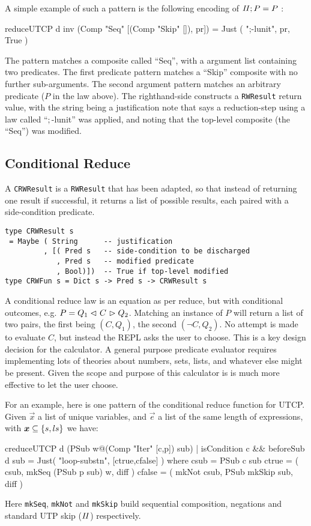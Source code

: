 A simple example of such a pattern is the following encoding
of $\mathit{II};P = P$ :
\begin{code}
reduceUTCP d inv (Comp "Seq" [(Comp "Skip" []), pr])
   =  Just ( ";-lunit", pr, True )
\end{code}
The pattern
matches a composite called ``Seq'',
with a argument list containing two predicates.
The first predicate pattern
matches a ``Skip'' composite with no further sub-arguments.
The second argument pattern matches an arbitrary predicate
($P$ in the law above).
The righthand-side constructs a \texttt{RWResult} return value,
with the string being a justification note that says a reduction-step
using a law called ``$;$-lunit'' was applied,
and noting that the top-level composite (the ``Seq'') was modified.


\subsection{Conditional Reduce}

A \texttt{CRWResult} is a \texttt{RWResult} that has been adapted,
so that instead of returning one result if successful,
it returns a list of possible results,
each paired with a side-condition predicate.
\begin{verbatim}
type CRWResult s
 = Maybe ( String      -- justification
         , [( Pred s   -- side-condition to be discharged
            , Pred s   -- modified predicate
            , Bool)])  -- True if top-level modified
type CRWFun s = Dict s -> Pred s -> CRWResult s
\end{verbatim}
A conditional reduce law is an equation as per reduce,
but with conditional outcomes, e.g. $P = Q_1 \mathrel{\lhd ~ {C} ~ \rhd} Q_2$.
Matching an instance of $P$ will return a list of two pairs,
the first being $(C,Q_1)$, the second $(\lnot C,Q_2)$.
No attempt is made to evaluate $C$, but instead the REPL
asks the user to choose.
This is a key design decision for the calculator.
A general purpose predicate evaluator requires implementing
lots of theories about numbers, sets, lists,
and whatever else might be present.
Given the scope and purpose of this calculator is is
much more effective to let the user choose.

For an example,
here is one pattern of the conditional reduce
function for UTCP.
Given $\vec x$ a list of unique variables,
and $\vec e$ a list of the same length of expressions,
with $\vec x \subseteq \setof{s,ls}$
we have:
\begin{code}
creduceUTCP d (PSub w@(Comp "Iter" [c,p]) sub)
 | isCondition c && beforeSub d sub
 = Just( "loop-substn", [ctrue,cfalse] )
 where
   csub = PSub c sub
   ctrue  = (       csub, mkSeq (PSub p sub) w, diff )
   cfalse = ( mkNot csub, PSub mkSkip sub, diff )
\end{code}
Here \texttt{mkSeq}, \texttt{mkNot} and \texttt{mkSkip} build sequential composition,
negations and standard UTP skip ($\mathit{II}$) respectively.



